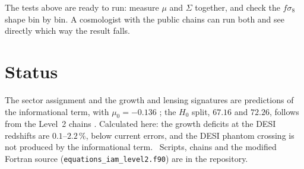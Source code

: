 The tests above are ready to run: measure $\mu$ and $\Sigma$ together, and check the $f\sigma_8$ shape bin by bin. A cosmologist with the public chains can run both and see directly which way the result falls.

\section{Status}
The sector assignment and the growth and lensing signatures are predictions of the informational term, with $\mu_0=-0.136$ \prediction; the $H_0$
split, $67.16$ and $72.26$, follows from the Level~2 chains \calc. Calculated here: the growth deficits at the DESI redshifts are $0.1$--$2.2\,\%$,
below current errors, and the DESI phantom crossing is not produced by the informational term. \calc\ Scripts, chains and the modified Fortran source
(\texttt{equations\_iam\_level2.f90}) are in the repository.
